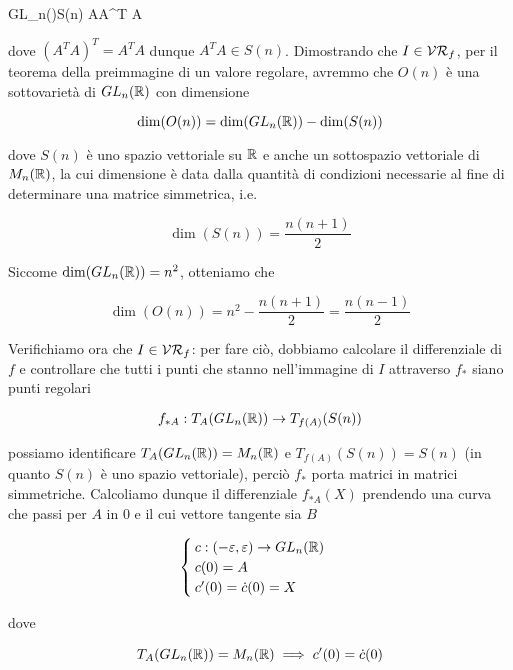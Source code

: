 	{GL_{n}(\R)}{S(n)}
	{A}{A^{T} A}

dove $ (A^{T} A)^{T} = A^{T} A $ dunque $ A^{T} A \in S(n) $. Dimostrando che $ I \in \mathcal{VR}_{f} $, per il teorema della preimmagine di un valore regolare, avremmo che $ O(n) $ è una sottovarietà di $ GL_{n}(\mathbb{R}) $ con dimensione

\begin{equation}
	\dim(O(n)) = \dim(GL_{n}(\mathbb{R})) - \dim(S(n))
\end{equation}

dove $ S(n) $ è uno spazio vettoriale su $ \mathbb{R} $ e anche un sottospazio vettoriale di $ M_{n}(\mathbb{R}) $, la cui dimensione è data dalla quantità di condizioni necessarie al fine di determinare una matrice simmetrica, i.e.

\begin{equation}
	\dim(S(n)) = \dfrac{n (n+1)}{2}
\end{equation}

Siccome $ \dim(GL_{n}(\mathbb{R})) = n^{2} $, otteniamo che

\begin{equation}
	\dim(O(n)) = n^{2} - \dfrac{n (n+1)}{2} = \dfrac{n (n-1)}{2}
\end{equation}

Verifichiamo ora che $ I \in \mathcal{VR}_{f} $: per fare ciò, dobbiamo calcolare il differenziale di $ f $ e controllare che tutti i punti che stanno nell'immagine di $ I $ attraverso $ f_{*} $ siano punti regolari

\begin{equation}
	f_{*A} : T_{A}(GL_{n}(\mathbb{R})) \to T_{f(A)}(S(n))
\end{equation}

possiamo identificare $ T_{A}(GL_{n}(\mathbb{R})) = M_{n}(\mathbb{R}) $ e $ T_{f(A)}(S(n)) = S(n) $ (in quanto $ S(n) $ è uno spazio vettoriale), perciò $ f_{*} $ porta matrici in matrici simmetriche. Calcoliamo dunque il differenziale $ f_{*A}(X) $ prendendo una curva che passi per $ A $ in 0 e il cui vettore tangente sia $ B $

\begin{equation}
	\begin{cases}
		c : (-\varepsilon,\varepsilon) \to GL_{n}(\mathbb{R}) \\
		c(0) = A \\
		c'(0) = \dot{c}(0) = X
	\end{cases}
\end{equation}

dove

\begin{equation}
	T_{A}(GL_{n}(\mathbb{R})) = M_{n}(\mathbb{R}) \implies c'(0) = \dot{c}(0)
\end{equation}

